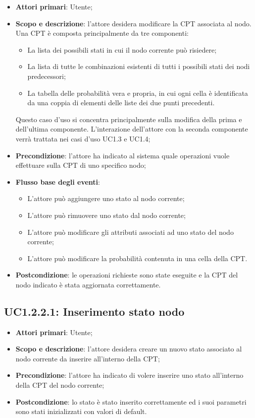 \begin{itemize} 
	\item{\textbf{Attori primari}: Utente;} 
	\item{\textbf{Scopo e descrizione}: l'attore desidera modificare la CPT associata al nodo. Una CPT è composta principalmente da tre componenti: 
		\begin{itemize} 
			\item{La lista dei possibili stati in cui il nodo corrente può risiedere;} 
			\item{La lista di tutte le combinazioni esistenti di tutti i possibili stati dei nodi predecessori;} 
			\item{La tabella delle probabilità vera e propria, in cui ogni cella è identificata da una coppia di elementi delle liste dei due punti precedenti.} 
		\end{itemize} 
		Questo caso d'uso si concentra principalmente sulla modifica della prima e dell'ultima componente. L'interazione dell'attore con la seconda componente verrà trattata nei casi d'uso UC1.3 e UC1.4;
	} 
	\item{\textbf{Precondizione}: l'attore ha indicato al sistema quale operazioni vuole effettuare sulla CPT di uno specifico nodo;} 
	\item{\textbf{Flusso base degli eventi}: } 
	\begin{itemize} 
		\item{L'attore può aggiungere uno stato al nodo corrente;} 
		\item{L'attore può rimuovere uno stato dal nodo corrente;} 
		\item{L'attore può modificare gli attributi associati ad uno stato del nodo corrente;} 
		\item{L'attore può modificare la probabilità contenuta in una cella della CPT.} 
	\end{itemize} 
	\item{\textbf{Postcondizione}: le operazioni richieste sono state eseguite e la CPT del nodo indicato è stata aggiornata correttamente.} 
\end{itemize} 
\subsection{UC1.2.2.1: Inserimento stato nodo} 
\hypertarget{UC1.2.2.1}{} 
\begin{itemize} 
	\item{\textbf{Attori primari}: Utente;} 
	\item{\textbf{Scopo e descrizione}: l'attore desidera creare un nuovo stato associato al nodo corrente da inserire all'interno della CPT;} 
	\item{\textbf{Precondizione}: l'attore ha indicato di volere inserire uno stato all'interno della CPT del nodo corrente;} 
	\item{\textbf{Postcondizione}: lo stato è stato inserito correttamente ed i suoi parametri sono stati inizializzati con valori di default.} 
\end{itemize} 
